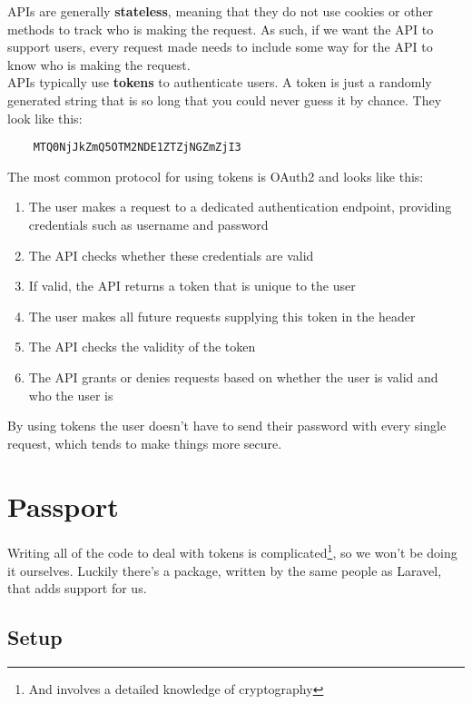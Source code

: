 APIs are generally \textbf{stateless}, meaning that they do not use cookies or other methods to track who is making the request. As such, if we want the API to support users, every request made needs to include some way for the API to know who is making the request.
\\

APIs typically use \textbf{tokens} to authenticate users. A token is just a randomly generated string that is so long that you could never guess it by chance. They look like this:

\begin{verbatim}
    MTQ0NjJkZmQ5OTM2NDE1ZTZjNGZmZjI3
\end{verbatim}

The most common protocol for using tokens is OAuth2 and looks like this:

\begin{enumerate}
    \item The user makes a request to a dedicated authentication endpoint, providing credentials such as username and password
    \item The API checks whether these credentials are valid
    \item If valid, the API returns a token that is unique to the user
    \item The user makes all future requests supplying this token in the header
    \item The API checks the validity of the token
    \item The API grants or denies requests based on whether the user is valid and who the user is
\end{enumerate}

By using tokens the user doesn't have to send their password with every single request, which tends to make things more secure.

\pagebreak

\section{Passport}

Writing all of the code to deal with tokens is complicated\footnote{And involves a detailed knowledge of cryptography}, so we won't be doing it ourselves. Luckily there's a package, written by the same people as Laravel, that adds support for us.


\subsection{Setup}

